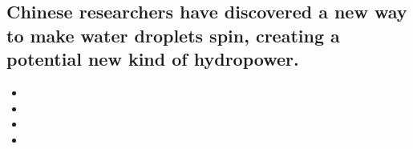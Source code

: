 \hypertarget{chinese-researchers-have-discovered-a-new-way-to-make-water-droplets-spin-creating-a-potential-new-kind-of-hydropower-1}{%
\subsection{Chinese researchers have discovered a new way to make water
droplets spin, creating a potential new kind of
hydropower.}\label{chinese-researchers-have-discovered-a-new-way-to-make-water-droplets-spin-creating-a-potential-new-kind-of-hydropower-1}}

\begin{itemize}
\item
\item
\item
\item
\end{itemize}


